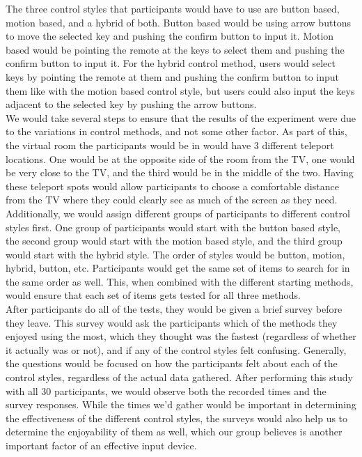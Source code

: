 \documentclass{vgtc}                          %
\begin{document}
The three control styles that participants would have to use are button based, motion based, and a hybrid of both. Button based would be using arrow buttons to move the selected key and pushing the confirm button to input it. Motion based would be pointing the remote at the keys to select them and pushing the confirm button to input it. For the hybrid control method, users would select keys by pointing the remote at them and pushing the confirm button to input them like with the motion based control style, but users could also input the keys adjacent to the selected key by pushing the arrow buttons. \\[1em]
We would take several steps to ensure that the results of the experiment were due to the variations in control methods, and not some other factor. As part of this, the virtual room the participants would be in would have 3 different teleport locations. One would be at the opposite side of the room from the TV, one would be very close to the TV, and the third would be in the middle of the two. Having these teleport spots would allow participants to choose a comfortable distance from the TV where they could clearly see as much of the screen as they need. Additionally, we would assign different groups of participants to different control styles first. One group of participants would start with the button based style, the second group would start with the motion based style, and the third group would start with the hybrid style. The order of styles would be button, motion, hybrid, button, etc. Participants would get the same set of items to search for in the same order as well. This, when combined with the different starting methods, would ensure that each set of items gets tested for all three methods.\\[1em]
After participants do all of the tests, they would be given a brief survey before they leave. This survey would ask the participants which of the methods they enjoyed using the most, which they thought was the fastest (regardless of whether it actually was or not), and if any of the control styles felt confusing. Generally, the questions would be focused on how the participants felt about each of the control styles, regardless of the actual data gathered.
After performing this study with all 30 participants, we would observe both the recorded times and the survey responses. While the times we’d gather would be important in determining the effectiveness of the different control styles, the surveys would also help us to determine the enjoyability of them as well, which our group believes is another important factor of an effective input device.
\end{document}
